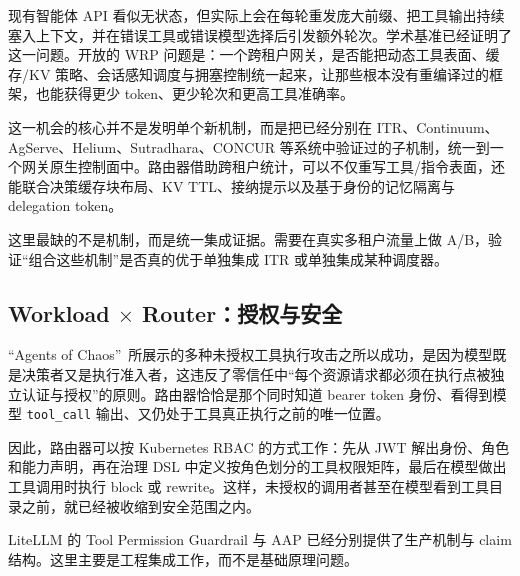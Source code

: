 \begin{opportunity}
\label{opp:gateway-agent-loops}
现有智能体 API 看似无状态，但实际上会在每轮重发庞大前缀、把工具输出持续塞入上下文，并在错误工具或错误模型选择后引发额外轮次。学术基准已经证明了这一问题。开放的 WRP 问题是：一个跨租户网关，是否能把动态工具表面、缓存/KV 策略、会话感知调度与拥塞控制统一起来，让那些根本没有重编译过的框架，也能获得更少 token、更少轮次和更高工具准确率。

这一机会的核心并不是发明单个新机制，而是把已经分别在 ITR、Continuum、AgServe、Helium、Sutradhara、CONCUR 等系统中验证过的子机制，统一到一个网关原生控制面中。路由器借助跨租户统计，可以不仅重写工具/指令表面，还能联合决策缓存块布局、KV TTL、接纳提示以及基于身份的记忆隔离与 delegation token。

\begin{frisk}
这里最缺的不是机制，而是统一集成证据。需要在真实多租户流量上做 A/B，验证“组合这些机制”是否真的优于单独集成 ITR 或单独集成某种调度器。
\end{frisk}
\end{opportunity}

\subsection{Workload $\times$ Router：授权与安全}
\label{sec:vision:auth}

\begin{opportunity}
\label{opp:rbac-enforcement}
“Agents of Chaos”~\cite{agentschaos2025}所展示的多种未授权工具执行攻击之所以成功，是因为模型既是决策者又是执行准入者，这违反了零信任中“每个资源请求都必须在执行点被独立认证与授权”的原则。路由器恰恰是那个同时知道 bearer token 身份、看得到模型 \texttt{tool\_call} 输出、又仍处于工具真正执行之前的唯一位置。

因此，路由器可以按 Kubernetes RBAC 的方式工作：先从 JWT 解出身份、角色和能力声明，再在治理 DSL 中定义按角色划分的工具权限矩阵，最后在模型做出工具调用时执行 block 或 rewrite。这样，未授权的调用者甚至在模型看到工具目录之前，就已经被收缩到安全范围之内。

\begin{frisk}
LiteLLM 的 Tool Permission Guardrail 与 AAP 已经分别提供了生产机制与 claim 结构。这里主要是工程集成工作，而不是基础原理问题。
\end{frisk}
\end{opportunity}

